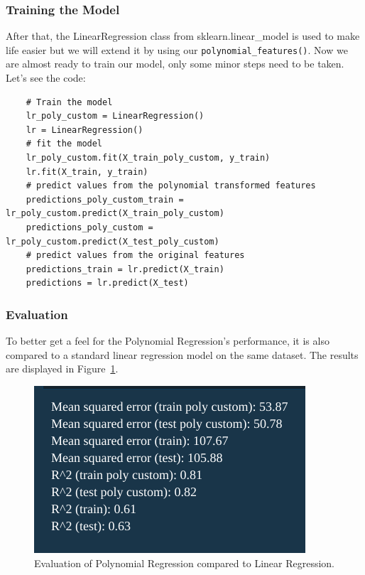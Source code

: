 \documentclass{CPSReport}
\begin{document}
\subsubsection{Training the Model}
After that, the LinearRegression class from sklearn.linear\_model is used to make life easier but we will extend it by using our \texttt{polynomial_features()}. Now we are almost ready to train our model, only some minor steps need to be taken. Let's see the code:
\begin{verbatim}
    # Train the model
    lr_poly_custom = LinearRegression()
    lr = LinearRegression()
    # fit the model
    lr_poly_custom.fit(X_train_poly_custom, y_train)
    lr.fit(X_train, y_train)
    # predict values from the polynomial transformed features
    predictions_poly_custom_train = lr_poly_custom.predict(X_train_poly_custom)
    predictions_poly_custom = lr_poly_custom.predict(X_test_poly_custom)
    # predict values from the original features
    predictions_train = lr.predict(X_train)
    predictions = lr.predict(X_test)
\end{verbatim}

\subsubsection{Evaluation}
To better get a feel for the Polynomial Regression's performance, it is also compared to a standard linear regression model on the same dataset. The results are displayed in Figure~\ref{fig:eval_poly}.
\begin{figure}[ht]
    \centering
    \includegraphics[width=0.9\linewidth]{pics/polynomial_eval.png}
    \caption{Evaluation of Polynomial Regression compared to Linear Regression.}
    \label{fig:eval_poly}
\end{figure}
\end{document}
